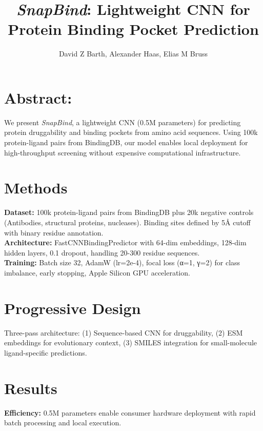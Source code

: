 \documentclass[11pt,a4paper]{article}
\title{\vspace{-0.5cm}\textit{SnapBind}: Lightweight CNN for Protein Binding Pocket Prediction}
\author{David Z Barth, Alexander Haas, Elias M Bruss}
\date{}
\begin{document}
\vspace{1cm}
\maketitle
\vspace{-0.3cm}

\begin{multicols}{2}

\section*{Abstract:} We present \textit{SnapBind}, a lightweight CNN (0.5M parameters) for predicting protein druggability and binding pockets from amino acid sequences. Using 100k protein-ligand pairs from BindingDB, our model enables local deployment for high-throughput screening without expensive computational infrastructure.

\section{Methods}

\noindent \quad \textbf{Dataset:} 100k protein-ligand pairs from BindingDB plus 20k negative controls (Antibodies, structural proteins, nucleases). Binding sites defined by 5Å cutoff with binary residue annotation. \\

\noindent \quad \textbf{Architecture:} FastCNNBindingPredictor with 64-dim embeddings, 128-dim hidden layers, 0.1 dropout, handling 20-300 residue sequences.\\

\noindent \quad \textbf{Training:} Batch size 32, AdamW (lr=2e-4), focal loss (α=1, γ=2) for class imbalance, early stopping, Apple Silicon GPU acceleration.

\section{Progressive Design}

Three-pass architecture: (1) Sequence-based CNN for druggability, (2) ESM embeddings for evolutionary context, (3) SMILES integration for small-molecule ligand-specific predictions.

\section{Results}

\textbf{Efficiency:} 0.5M parameters enable consumer hardware deployment with rapid batch processing and local execution. \\


\end{multicols}
\end{document}
